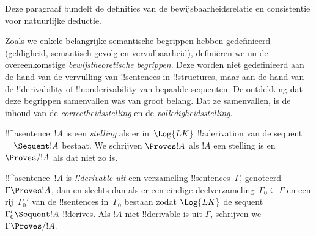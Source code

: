 \documentclass[../../../include/open-logic-section]{subfiles}
\begin{document}
\begin{editorial}
  Deze paragraaf bundelt de definities van de bewijsbaarheidsrelatie en
  consistentie voor natuurlijke deductie.
\end{editorial}

      {}
      {}


\begin{explain}
Zoals we enkele belangrijke semantische begrippen hebben gedefinieerd
(geldigheid, semantisch gevolg en vervulbaarheid), definiëren we nu de
overeenkomstige \emph{bewijstheoretische begrippen}. Deze worden niet
gedefinieerd aan de hand van de vervulling van !!{sentence}s in
!!{structure}s, maar aan de hand van de !!{derivability} of
!!{nonderivability} van bepaalde sequenten. De ontdekking dat deze
begrippen samenvallen was van groot belang. Dat ze samenvallen, is de
inhoud van de \emph{correctheidsstelling} en de
\emph{volledigheidsstelling}.
\end{explain}

\begin{defn}[Stellingen]
!!^a{sentence}~$!A$ is een \emph{stelling} als er in~$\Log{LK}$
!!a{derivation} van de sequent $\quad \Sequent !A$ bestaat. We schrijven
$\Proves !A$ als $!A$ een stelling is en $\Proves/ !A$ als dat niet zo
is.
\end{defn}

\begin{defn}[!!^{derivability}]
!!^a{sentence}~$!A$ is \emph{!!{derivable} uit} een verzameling
!!{sentence}s~$\Gamma$, genoteerd $\Gamma \Proves !A$, dan en slechts
dan als er een eindige deelverzameling~$\Gamma_0 \subseteq \Gamma$ en
een rij~$\Gamma_0'$ van de !!{sentence}s in~$\Gamma_0$ bestaan zodat
$\Log{LK}$ de sequent $\Gamma_0' \Sequent !A$ !!{derive}s. Als $!A$
niet !!{derivable} is uit $\Gamma$, schrijven we $\Gamma \Proves/ !A$.
\end{defn}
\end{document}
